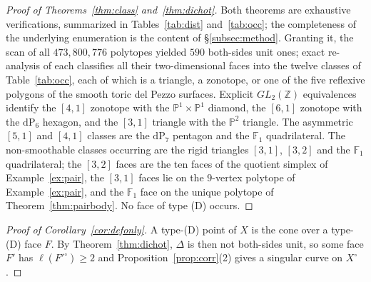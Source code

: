 \documentclass[11pt]{amsart}
\theoremstyle{definition}
\theoremstyle{remark}
\newcommand{\ZZ}{\mathbb{Z}}
\newcommand{\PP}{\mathbb{P}}
\newcommand{\FF}{\mathbb{F}}
\begin{document}
\begin{proof}[Proof of Theorems~\textup{\ref{thm:class}}
and~\textup{\ref{thm:dichot}}]
Both theorems are exhaustive verifications, summarized in
Tables~\ref{tab:dist} and~\ref{tab:occ}; the completeness of the
underlying enumeration is the content of \S\ref{subsec:method}.
Granting it, the scan of all $473{,}800{,}776$ polytopes yielded
$590$ both-sides unit ones; exact re-analysis of each classifies all their
two-dimensional faces into the twelve classes of Table~\ref{tab:occ}, each
of which is a triangle, a zonotope, or one of the five reflexive polygons
of the smooth toric del Pezzo surfaces.  Explicit $GL_2(\ZZ)$
equivalences identify the $[4,1]$ zonotope with the
$\PP^1{\times}\PP^1$ diamond, the $[6,1]$ zonotope with the
$\mathrm{dP}_6$ hexagon, and the $[3,1]$ triangle with the $\PP^2$
triangle.  The asymmetric $[5,1]$ and $[4,1]$ classes are the
$\mathrm{dP}_7$ pentagon and the $\FF_1$ quadrilateral.  The non-smoothable classes occurring are the
rigid triangles $[3,1]$, $[3,2]$ and the $\FF_1$ quadrilateral; the
$[3,2]$ faces are the ten faces of the quotient simplex of
Example~\ref{ex:pair}, the $[3,1]$ faces lie on the $9$-vertex polytope of
Example~\ref{ex:pair}, and
the $\FF_1$ face on the unique polytope of
Theorem~\ref{thm:pairbody}.  No face of type \textup{(D)} occurs.
\end{proof}

\begin{proof}[Proof of Corollary~\textup{\ref{cor:defonly}}]
A type-\textup{(D)} point of $X$ is the cone over a type-\textup{(D)} face
$F$.  By Theorem~\ref{thm:dichot}, $\Delta$ is then not both-sides unit, so
some face $F'$ has $\ell(F'^\circ) \ge 2$ and Proposition~\ref{prop:corr}(2)
gives a singular curve on $X^\circ$.
\end{proof}
\end{document}
